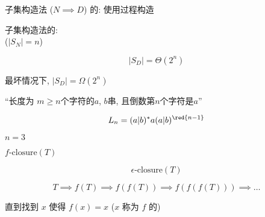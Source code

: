 \begin{frame}{}
  \begin{center}
    子集构造法 ($N \implies D$) 的:
    使用过程构造

  \end{center}
\end{frame}

\begin{frame}{}
  \begin{center}
    子集构造法的: \\
    ($|S_{N}| = n$)

    \[
      |S_{D}| = \Theta(2^n)
    \]

    \vspace{0.30cm}
    最坏情况下, $|S_{D}| = \Omega(2^n)$
  \end{center}
\end{frame}

\begin{frame}{}
  \begin{center}
    ``长度为 $m \ge n$个字符的$a$, $b$串, 且倒数第$n$个字符是$a$''

    \pause
    \[
      L_{n} = (a | b)^{\ast} a (a | b)^{\red{n-1}}
    \]

    \pause

    \pause
    \vspace{0.30cm}
     $n = 3$
  \end{center}
\end{frame}

\begin{frame}{}
  \begin{center}
     $f\text{-closure}(T)$

    \pause
    \[
      \epsilon\text{-closure}(T)
    \]

    \pause
    \[
      T \implies f(T) \implies f(f(T)) \implies f(f(f(T))) \implies \dots
    \]

    \pause
    直到找到 $x$ 使得 $f(x) = x$ ($x$ 称为 $f$ 的)
  \end{center}
\end{frame}
